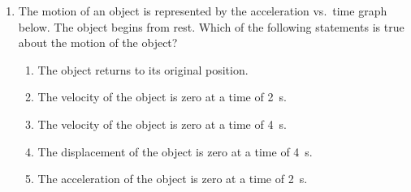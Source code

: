 \documentclass{../../../oss-apphys}
\begin{document}
\begin{multicols}{2}
\begin{enumerate}[resume,leftmargin=18pt]
    
  \item The motion of an object is represented by the acceleration vs.\ time
    graph below. The object begins from rest. Which of the following statements
    is true about the motion of the object?
    \begin{center}
    \end{center}
    \begin{enumerate}[noitemsep,topsep=0pt,leftmargin=18pt,label=(\Alph*)]
    \item The object returns to its original position.
    \item The velocity of the object is zero at a time of \SI{2}{\second}.
    \item The velocity of the object is zero at a time of \SI{4}{\second}.
    \item The displacement of the object is zero at a time of \SI{4}{\second}.
    \item The acceleration of the object is zero at a time of \SI{2}{\second}.
    \end{enumerate}

\end{enumerate}
\end{multicols}
\end{document}
